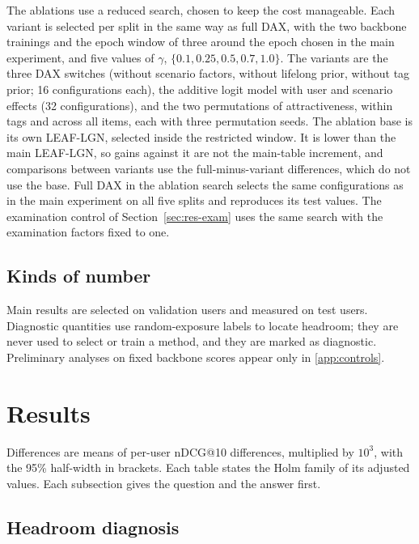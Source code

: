 \documentclass[preprint,12pt,authoryear]{elsarticle}
\begin{document}
The ablations use a reduced search, chosen to keep the cost manageable. Each variant is selected per split in the same way as full DAX, with the
two backbone trainings and the epoch window of three around the epoch chosen in the main experiment, and five values of $\gamma$,
$\{0.1,0.25,0.5,0.7,1.0\}$. The variants are the three DAX switches (without scenario factors, without lifelong prior, without tag prior; 16
configurations each), the additive logit model with user and scenario effects (32 configurations), and the two permutations of attractiveness,
within tags and across all items, each with three permutation seeds. The ablation base is its own LEAF-LGN, selected inside the restricted window.
It is lower than the main LEAF-LGN, so gains against it are not the main-table increment, and comparisons between variants use the full-minus-variant
differences, which do not use the base. Full DAX in the ablation search selects the same configurations as in the main experiment on all five
splits and reproduces its test values. The examination control of Section~\ref{sec:res-exam} uses the same search with the
examination factors fixed to one.

\subsection{Kinds of number}
\label{sec:protocol-kinds}

Main results are selected on validation users and measured on test users. Diagnostic quantities use random-exposure labels to locate headroom;
they are never used to select or train a method, and they are marked as diagnostic. Preliminary analyses on fixed backbone scores appear only in
\ref{app:controls}.

\section{Results}
\label{sec:results}

Differences are means of per-user nDCG@10 differences, multiplied by $10^{3}$, with the 95\% half-width in brackets. Each table states
the Holm family of its adjusted values. Each subsection gives the question and the answer first.

\subsection{Headroom diagnosis}
\label{sec:res-headroom}
\end{document}
